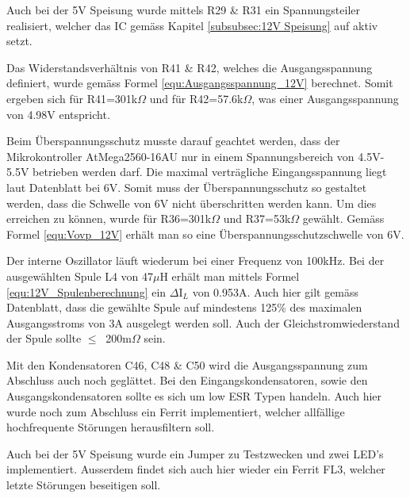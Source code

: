 Auch bei der 5V Speisung wurde mittels R29 \& R31 ein Spannungsteiler realisiert, welcher das IC gemäss Kapitel \ref{subsubsec:12V Speisung} auf aktiv setzt.

Das Widerstandsverhältnis von R41 \& R42, welches die Ausgangsspannung definiert, wurde gemäss Formel \ref{equ:Ausgangsspannung_12V} berechnet. Somit ergeben sich für R41=301k$\Omega$ und für R42=57.6k$\Omega$, was einer Ausgangsspannung von 4.98V entspricht. \cite[S.10]{monolithic_power_systems_mp24943_2011} 

Beim Überspannungsschutz musste darauf geachtet werden, dass der Mikrokontroller AtMega2560-16AU nur in einem Spannungsbereich von 4.5V-5.5V betrieben werden darf. Die maximal verträgliche Eingangsspannung liegt laut Datenblatt bei 6V. Somit muss der Überspannungsschutz so gestaltet werden, dass die Schwelle von 6V nicht überschritten werden kann. Um dies erreichen zu können, wurde für R36=301k$\Omega$ und R37=53k$\Omega$ gewählt. Gemäss Formel \ref{equ:Vovp_12V} erhält man so eine Überspannungsschutzschwelle von 6V. \cite[S.1]{atmel_atmel_2014} \cite[S.10]{monolithic_power_systems_mp24943_2011}

Der interne Oszillator läuft wiederum bei einer Frequenz von 100kHz. Bei der ausgewählten Spule L4 von 47$\mu$H erhält man mittels Formel \ref{equ:12V_Spulenberechnung} ein $\Delta$I$_{L}$ von 0.953A. Auch hier gilt gemäss Datenblatt, dass die gewählte Spule auf mindestens 125\% des maximalen Ausgangsstroms von 3A ausgelegt werden soll. Auch der Gleichstromwiederstand der Spule sollte $ \leq \ $ 200m$\Omega$  sein. \cite[S.3]{monolithic_power_systems_mp24943_2011} \cite[S.10]{monolithic_power_systems_mp24943_2011} 

Mit den Kondensatoren C46, C48 \& C50 wird die Ausgangsspannung zum Abschluss auch noch geglättet. Bei den Eingangskondensatoren, sowie den Ausgangskondensatoren sollte es sich um low ESR Typen handeln. Auch hier wurde noch zum Abschluss ein Ferrit implementiert, welcher allfällige hochfrequente Störungen herausfiltern soll.

Auch bei der 5V Speisung wurde ein Jumper zu Testzwecken und zwei LED's implementiert. Ausserdem findet sich auch hier wieder ein Ferrit FL3, welcher letzte Störungen beseitigen soll. 


